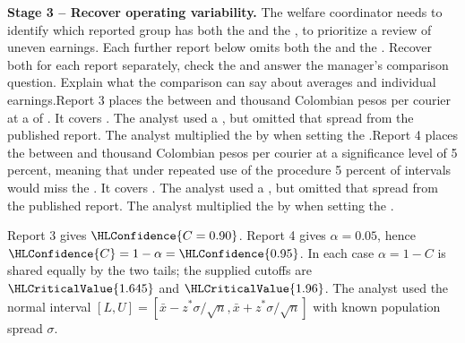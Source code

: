 \textbf{Stage 3 -- Recover operating variability.} The welfare coordinator needs to identify which reported group has both the   and the  , to prioritize a review of uneven earnings. Each further report below omits both the   and the  . Recover both for each report separately, check the  and answer the manager's comparison question. Explain what the comparison can say about averages and individual earnings.\newline Report 3 places the  between  and  thousand Colombian pesos per courier at a  of . It covers . The analyst used a   , but omitted that spread from the published report. The analyst multiplied the   by  when setting the   .\newline Report 4 places the  between  and  thousand Colombian pesos per courier at a significance level of 5 percent, meaning that under repeated use of the procedure 5 percent of intervals would miss the . It covers . The analyst used a   , but omitted that spread from the published report. The analyst multiplied the   by  when setting the   .
\par\endgroup

\begingroup
\setlength{\abovedisplayskip}{6pt}
\setlength{\belowdisplayskip}{6pt}
\setlength{\abovedisplayshortskip}{3pt}
\setlength{\belowdisplayshortskip}{4pt}
\setlength{\parskip}{4pt}

Report 3 gives $\HLConfidence{C=0.90}$. Report 4 gives $\alpha=0.05$, hence $\HLConfidence{C}=1-\alpha=\HLConfidence{0.95}$. In each case $\alpha=1-C$ is shared equally by the two tails; the supplied cutoffs are $\HLCriticalValue{1.645}$ and $\HLCriticalValue{1.96}$. The analyst used the normal interval $[L,U]=[\bar x-z^*\sigma/\sqrt n,\bar x+z^*\sigma/\sqrt n]$ with known population spread $\sigma$.

